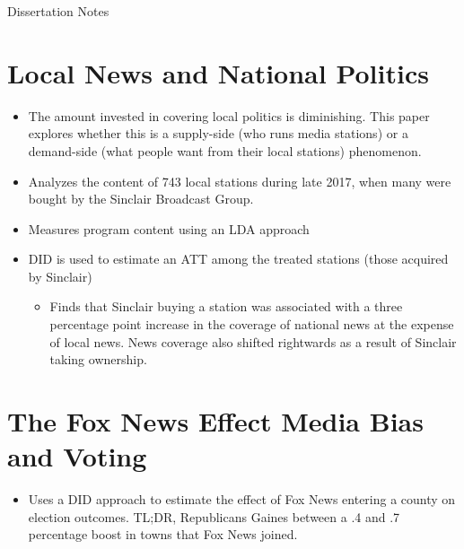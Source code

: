 \documentclass{article}
\renewcommand\maketitle{}
\begin{document}
\maketitle{Dissertation Notes}
\section{Local News and National Politics}
\begin{itemize}
	\item The amount invested in covering local politics is diminishing. This paper explores whether this is a supply-side (who runs media stations) or a demand-side (what people want from their local stations) phenomenon.
	\item Analyzes the content of 743 local stations during late 2017, when many were bought by the Sinclair Broadcast Group.
	\item Measures program content using an LDA approach
	\item DID is used to estimate an ATT among the treated stations (those acquired by Sinclair)
	\begin{itemize}
		\item Finds that Sinclair buying a station was associated with a three percentage point increase in the coverage of national news at the expense of local news. News coverage also shifted rightwards as a result of Sinclair taking ownership.
	\end{itemize}
\end{itemize}
\section{The Fox News Effect Media Bias and Voting}
\begin{itemize}
	\item Uses a DID approach to estimate the effect of Fox News entering a county on election outcomes. TL;DR, Republicans Gaines between a .4 and .7 percentage boost in towns that Fox News joined.
\end{itemize}



\printbibliography{}
\end{document}
